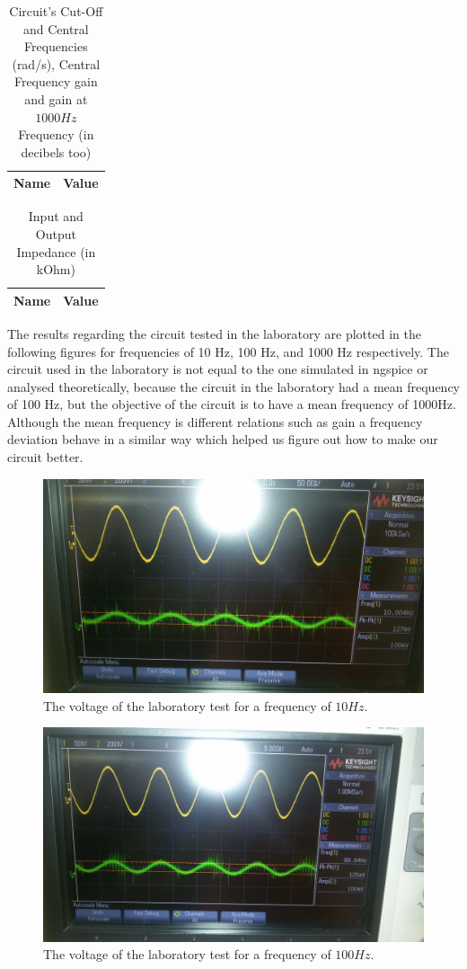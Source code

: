 \begin{table}[H]
\centering
\begin{tabular}{|l|l|}
\hline
{\bf Name} & {\bf Value} \\ \hline
    
\end{tabular}
\caption{Circuit's Cut-Off and Central Frequencies (rad/s), Central Frequency gain and gain at $1000Hz$ Frequency (in decibels too)}
\end{table}

\begin{table}[H]
\centering
\begin{tabular}{|l|l|}
\hline
{\bf Name} & {\bf Value} \\ \hline
    
    
\end{tabular}
\caption{Input and Output Impedance (in kOhm)}
\end{table}

The results regarding the circuit tested in the laboratory are plotted in the following figures for frequencies of 10 Hz, 100 Hz, and 1000 Hz respectively.
The circuit used in the laboratory is not equal to the one simulated in ngspice or analysed theoretically, because the circuit in the laboratory had a mean frequency of 100 Hz, but the objective of the circuit is to have a mean frequency of 1000Hz. Although the mean frequency is different relations such as gain a frequency deviation behave in a similar way which helped us figure out how to make our circuit better.

\begin{figure}[H] 
\centering
\includegraphics[width=0.6\linewidth]{10Hz.jpeg}
\caption{The voltage of the laboratory test for a frequency of $10Hz$.}
\label{Fig9: 10Hz}
\end{figure}

\begin{figure}[H] 
\centering
\includegraphics[width=0.6\linewidth]{100Hz.jpeg}
\caption{The voltage of the laboratory test for a frequency of $100Hz$.}
\label{Fig10: 100Hz}
\end{figure}

